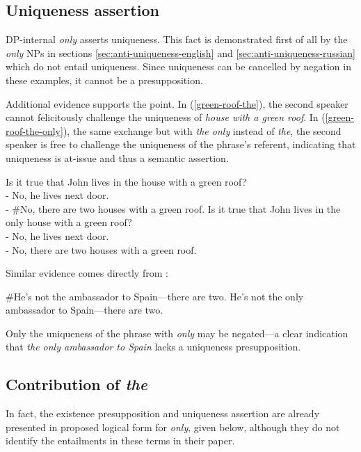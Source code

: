 \subsection{Uniqueness assertion}
DP-internal \textit{only} asserts uniqueness. This fact is demonstrated first of all by the \textit{only} NPs in sections \ref{sec:anti-uniqueness-english} and \ref{sec:anti-uniqueness-russian} which do not entail uniqueness. Since uniqueness can be cancelled by negation in these examples, it cannot be a presupposition.

Additional evidence supports the point. In (\ref{green-roof-the}), the second speaker cannot felicitously challenge the uniqueness of \textit{house with a green roof}. In (\ref{green-roof-the-only}), the same exchange but with \textit{the only} instead of \textit{the}, the second speaker is free to challenge the uniqueness of the phrase's referent, indicating that uniqueness is at-issue and thus a semantic assertion.

\begin{exe}
	\ex \label{green-roof-the} Is it true that John lives in the house with a green roof? \\
	    - No, he lives next door. \\
	    - \#No, there are two houses with a green roof.
	\ex \label{green-roof-the-only} Is it true that John lives in the only house with a green roof? \\
	    - No, he lives next door. \\
	    - No, there are two houses with a green roof.
\end{exe}

Similar evidence comes directly from \citet{cb2015}:

\begin{exe}
	\ex \#He's not the ambassador to Spain---there are two.
	\ex He's not the only ambassador to Spain---there are two.
\end{exe}

Only the uniqueness of the phrase with \textit{only} may be negated---a clear indication that \textit{the only ambassador to Spain} lacks a uniqueness presupposition.

\subsection{Contribution of \textit{the}}
In fact, the existence presupposition and uniqueness assertion are already presented in  proposed logical form for \textit{only}, given below, although they do not identify the entailments in these terms in their paper.

